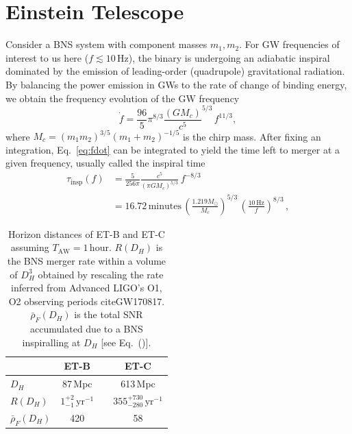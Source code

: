 \documentclass{aa}
\newcommand{\be}{\begin{equation}}
\newcommand{\ee}{\end{equation}}
\newcommand{\f}{\frac}
\newcommand{\nn}{\nonumber}
\begin{document}
\section{Einstein Telescope}
\label{sect:et}
Consider a BNS system with component masses
$m_1, m_2$. For GW frequencies of interest to us here ($f \lesssim 10\,$Hz), the binary is undergoing an adiabatic inspiral dominated by
the emission of leading-order (quadrupole)
gravitational radiation. By balancing the
power emission in GWs to the rate of change of binding energy, we obtain the frequency evolution of the GW frequency
%
\be
\dot{f} = \f{96}{5}\pi^{8/3} \f{(G M_c)}{c^5}^{5/3}\, f^{11/3}, \label{eq:fdot}
\ee
where $M_c  = {(m_1 m_2)^{3/5}}{(m_1+m_2)^{-1/5}} $ is the chirp mass.
After fixing an integration, Eq.~\ref{eq:fdot}
can be integrated to yield the time left to merger at a given frequency, usually called the inspiral time
%
\begin{align}
\tau_\text{insp}(f) &= \f{5}{256\pi}\f{c^5}{(\pi G M_c)^{5/3}} \,f^{-8/3}\nn\\
&=16.72\,\text{minutes} \, \left(\f{1.219 M_\odot}{M_c}\right)^{5/3}\,\left(\f{10\,\text{Hz}}{f}\right)^{8/3}
\label{eq:tau_insp}\, ,
\end{align}
%



\begin{table}[h]
 \caption{Horizon distances of ET-B and ET-C assuming $T_\text{AW} =1\,$hour. $R(D_H)$ is the BNS merger rate within a volume of $D_H^3$
obtained by rescaling the rate inferred from Advanced LIGO's O1, O2 observing periods cite{GW170817}. $\bar\rho_F(D_H)$ is the total SNR accumulated due to a BNS inspiralling at $D_H$ [see Eq.~()].}
\label{table:horizon}
\centering
\begin{tabular}{l|ccc}
\hline
 & ET-B & & ET-C\\
\hline
  $D_H $& 87\,Mpc& &{613\,Mpc}\\
  $R(D_H) $& $1^{+2}_{-1}\,\text{yr}^{-1}$&\hspace{5mm} &{$355^{+730}_{-280}\,\text{yr}^{-1}$}\\
  $\bar\rho_F(D_H)$ & 420 &&{58}\\
\hline
\end{tabular}
\end{table}
\end{document}
